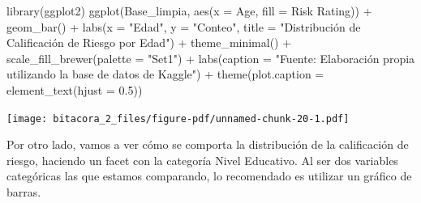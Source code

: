\documentclass[
  letterpaper,
  DIV=11,
  numbers=noendperiod]{scrreprt}
\newenvironment{Shaded}{\begin{snugshade}}{\end{snugshade}}
\newcommand{\AttributeTok}[1]{\textcolor[rgb]{0.40,0.45,0.13}{#1}}
\newcommand{\FloatTok}[1]{\textcolor[rgb]{0.68,0.00,0.00}{#1}}
\newcommand{\FunctionTok}[1]{\textcolor[rgb]{0.28,0.35,0.67}{#1}}
\newcommand{\NormalTok}[1]{\textcolor[rgb]{0.00,0.23,0.31}{#1}}
\newcommand{\SpecialCharTok}[1]{\textcolor[rgb]{0.37,0.37,0.37}{#1}}
\newcommand{\StringTok}[1]{\textcolor[rgb]{0.13,0.47,0.30}{#1}}
\begin{document}
\begin{Shaded}
\begin{Highlighting}[]
\FunctionTok{library}\NormalTok{(ggplot2)}
\FunctionTok{ggplot}\NormalTok{(Base\_limpia, }\FunctionTok{aes}\NormalTok{(}\AttributeTok{x =}\NormalTok{ Age, }\AttributeTok{fill =} \StringTok{\textasciigrave{}}\AttributeTok{Risk Rating}\StringTok{\textasciigrave{}}\NormalTok{)) }\SpecialCharTok{+}
  \FunctionTok{geom\_bar}\NormalTok{() }\SpecialCharTok{+}  
  \FunctionTok{labs}\NormalTok{(}\AttributeTok{x =} \StringTok{"Edad"}\NormalTok{, }\AttributeTok{y =} \StringTok{"Conteo"}\NormalTok{, }\AttributeTok{title =} \StringTok{"Distribución de Calificación de Riesgo por Edad"}\NormalTok{) }\SpecialCharTok{+} 
  \FunctionTok{theme\_minimal}\NormalTok{() }\SpecialCharTok{+}  
  \FunctionTok{scale\_fill\_brewer}\NormalTok{(}\AttributeTok{palette =} \StringTok{"Set1"}\NormalTok{)  }\SpecialCharTok{+}
  \FunctionTok{labs}\NormalTok{(}\AttributeTok{caption =} \StringTok{"Fuente: Elaboración propia utilizando la base de datos de Kaggle"}\NormalTok{) }\SpecialCharTok{+}
\FunctionTok{theme}\NormalTok{(}\AttributeTok{plot.caption =} \FunctionTok{element\_text}\NormalTok{(}\AttributeTok{hjust =} \FloatTok{0.5}\NormalTok{)) }
\end{Highlighting}
\end{Shaded}

\texttt{[image: bitacora\_2\_files/figure-pdf/unnamed-chunk-20-1.pdf]}

Por otro lado, vamos a ver cómo se comporta la distribución de la
calificación de riesgo, haciendo un facet con la categoría Nivel
Educativo. Al ser dos variables categóricas las que estamos comparando,
lo recomendado es utilizar un gráfico de barras.
\end{document}
